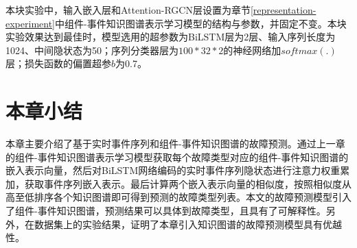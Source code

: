 本块实验中，输入嵌入层和Attention-RGCN层设置为章节\ref{representation-experiment}中组件-事件知识图谱表示学习模型的结构与参数，并固定不变。本块实验效果达到最佳时，模型选用的超参数为BiLSTM层为2层、输入序列长度为1024、中间隐状态为50；序列分类器层为$100*32*2$的神经网络加$softmax(.)$层；损失函数的偏置超参$b$为0.7。
\section{本章小结}
本章主要介绍了基于实时事件序列和组件-事件知识图谱的故障预测。通过上一章的组件-事件知识图谱表示学习模型获取每个故障类型对应的组件-事件知识图谱的嵌入表示向量，然后对BiLSTM网络编码的实时事件序列隐状态进行注意力权重累加，获取事件序列嵌入表示。最后计算两个嵌入表示向量的相似度，按照相似度从高至低排序各个知识图谱即可得到预测的故障类型列表。本文的故障预测模型引入了组件-事件知识图谱，预测结果可以具体到故障类型，且具有了可解释性。另外，在数据集上的实验结果，证明了本章引入知识图谱的故障预测模型具有优越性。